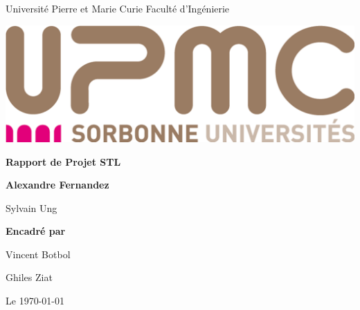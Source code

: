 \begin{titlepage}
\parindent=0pt
Université Pierre et Marie Curie   Faculté d'Ingénierie
\begin{center}
\includegraphics[scale=0.2]{images/logo_upmc.jpg}%
\end{center}
\hrulefill
\begin{center}\bfseries\Huge
  Rapport de Projet STL
\end{center}
\hrulefill
\vspace*{1cm}
\begin{center}\bfseries\Large
Alexandre Fernandez

Sylvain Ung
\end{center}
    
\begin{center}\bfseries\Large
Encadré par

Vincent Botbol 

Ghiles Ziat
\end{center}
\begin{flushright}
  Le \today 
\end{flushright}   

\end{titlepage}